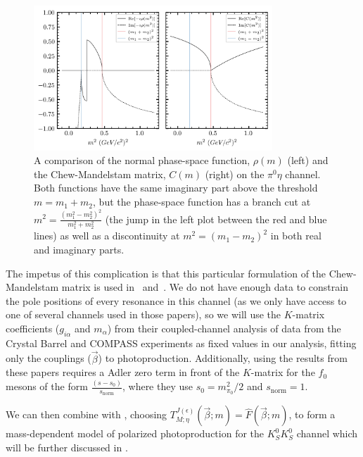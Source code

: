 \begin{figure}
  \begin{center}
    \includegraphics[width=0.8\textwidth]{figures/chew_mandelstam.png}
  \end{center}
  \caption{A comparison of the normal phase-space function, $\rho(m)$ (left) and the Chew-Mandelstam matrix, $C(m)$ (right) on the $\pi^0\eta$ channel. Both functions have the same imaginary part above the threshold $m = m_1 + m_2$, but the phase-space function has a branch cut at $m^2 = \frac{(m_1^2 - m_2^2)^2}{m_1^2 + m_2^2}$ (the jump in the left plot between the red and blue lines) as well as a discontinuity at $m^2 = (m_1 - m_2)^2$ in both real and imaginary parts.}\label{fig:chew-mandelstam}
\end{figure}


The impetus of this complication is that this particular formulation of the Chew-Mandelstam matrix is used in~\cite{Albrecht2020} and~\cite{Kopf2021}. We do not have enough data to constrain the pole positions of every resonance in this channel (as we only have access to one of several channels used in those papers), so we will use the $K$-matrix coefficients ($g_{i\alpha}$ and $m_\alpha$) from their coupled-channel analysis of data from the Crystal Barrel and COMPASS experiments as fixed values in our analysis, fitting only the couplings ($\vec{\beta}$) to photoproduction. Additionally, using the results from these papers requires a Adler zero term in front of the $K$-matrix for the $f_0$ mesons of the form $\frac{(s - s_0)}{s_\text{norm}}$, where they use $s_0 = m^2_{\pi_0}/2$ and $s_\text{norm} = 1$.

We can then combine  with , choosing $T^{J(\epsilon)}_{M;\eta}(\vec{\beta}; m) = \hat{F}(\vec{\beta}; m)$, to form a mass-dependent model of polarized photoproduction for the $K_S^0K_S^0$ channel which will be further discussed in .
